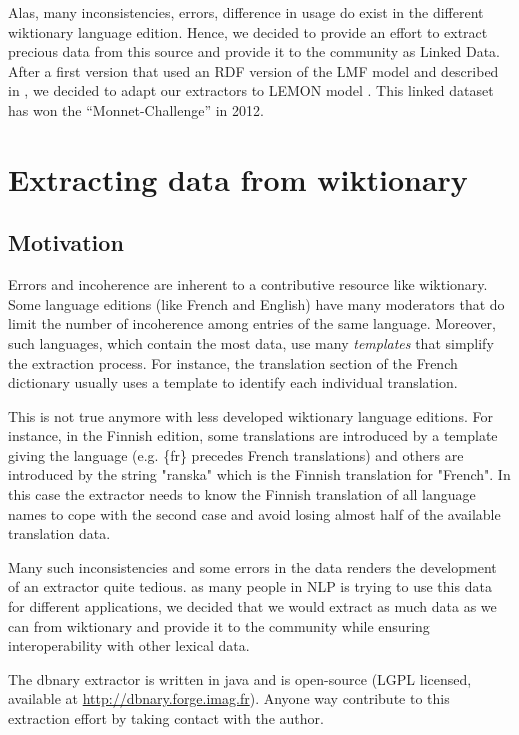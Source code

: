\documentclass[sw]{iosart2c}
\begin{document}
Alas, many inconsistencies, errors, difference in usage do exist in the different wiktionary language edition. Hence, we decided to provide an effort to extract precious data from this source and provide it to the community as Linked Data. After a first version that used an RDF version of the LMF model \cite{FRANCOPOULO:2006:INRIA-00121468:1,francopoulo-EtAl:2006:MLRI} and described in \cite{serasset:lrec2012}, we decided to adapt our extractors to LEMON model \cite{McRae-lemon:2012}. This linked dataset has won the ``Monnet-Challenge'' in 2012.

\section{Extracting data from wiktionary}

\subsection{Motivation}

Errors and incoherence are inherent to a contributive resource like wiktionary. Some language editions (like French and English) have many moderators that do limit the number of incoherence among entries of the same language. Moreover, such languages, which contain the most data, use many \textit{templates} that simplify the extraction process. For instance, the translation section of the French dictionary usually uses a template to identify each individual translation.

This is not true anymore with less developed wiktionary language editions. For instance, in the Finnish edition, some translations are introduced by a template giving the language (e.g. \{fr\} precedes French translations) and others are introduced by the string "ranska" which is the Finnish translation for "French". In this case the extractor needs to know the Finnish translation of all language names to cope with the second case and avoid losing almost half of the available translation data.

Many such inconsistencies and some errors in the data renders the development of an extractor quite tedious. as many people in NLP is trying to use this data for different applications, we decided that we would extract as much data as we can from wiktionary and provide it to the community while ensuring interoperability with other lexical data.

The dbnary extractor is written in java and is open-source (LGPL licensed, available at \url{http://dbnary.forge.imag.fr}). Anyone way contribute to this extraction effort by taking contact with the author.
\end{document}
